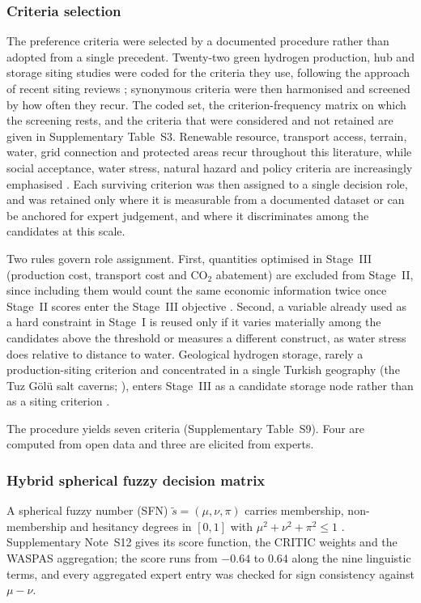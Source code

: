 \documentclass[preprint,12pt,authoryear]{elsarticle}
\begin{document}
\subsubsection{Criteria selection}
The preference criteria were selected by a documented procedure rather than adopted from a single precedent. Twenty-two green hydrogen production, hub and storage siting studies were coded for the criteria they use, following the approach of recent siting reviews \citep{zun2026review,pinedaserna2023}; synonymous criteria were then harmonised and screened by how often they recur. The coded set, the criterion-frequency matrix on which the screening rests, and the criteria that were considered and not retained are given in Supplementary Table~S3. Renewable resource, transport access, terrain, water, grid connection and protected areas recur throughout this literature, while social acceptance, water stress, natural hazard and policy criteria are increasingly emphasised \citep{zun2026review,tonelli2023global}. Each surviving criterion was then assigned to a single decision role, and was retained only where it is measurable from a documented dataset or can be anchored for expert judgement, and where it discriminates among the candidates at this scale.

Two rules govern role assignment. First, quantities optimised in Stage~III (production cost, transport cost and CO$_2$ abatement) are excluded from Stage~II, since including them would count the same economic information twice once Stage~II scores enter the Stage~III objective \citep{zun2026review}. Second, a variable already used as a hard constraint in Stage~I is reused only if it varies materially among the candidates above the threshold or measures a different construct, as water stress does relative to distance to water. Geological hydrogen storage, rarely a production-siting criterion and concentrated in a single Turkish geography (the Tuz Gölü salt caverns; \citealp{ozarslan2012}), enters Stage~III as a candidate storage node rather than as a siting criterion \citep{raeesi2023}.

The procedure yields seven criteria (Supplementary Table~S9). Four are computed from open data and three are elicited from experts.


\subsubsection{Hybrid spherical fuzzy decision matrix}
A spherical fuzzy number (SFN) $\tilde{s} = (\mu, \nu, \pi)$ carries membership, non-membership and hesitancy degrees in $[0,1]$ with $\mu^2 + \nu^2 + \pi^2 \le 1$ \citep{gundogdu2019spherical}. Supplementary Note~S12 gives its score function, the CRITIC weights and the WASPAS aggregation; the score runs from $-0.64$ to $0.64$ along the nine linguistic terms, and every aggregated expert entry was checked for sign consistency against $\mu-\nu$.
\end{document}

